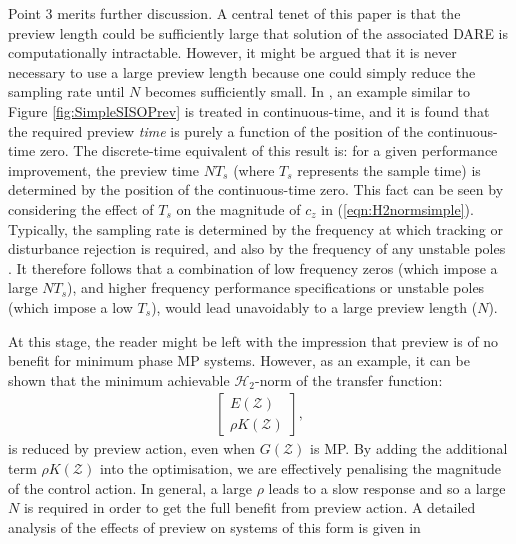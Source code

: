 \documentclass[a4paper,12pt]{article}
\theoremstyle{remark}
\newcommand{\ma}[1]{\begin{bmatrix} #1 \end{bmatrix}}
\newcommand{\als}[1]{\begin{align*} #1 \end{align*}}
\newcommand{\htwo}{\mathcal H_2}
\newcommand{\z}{\cal{Z}}
\renewcommand{\z}{\mathcal{Z}}
\begin{document}
Point 3 merits further discussion. A central tenet of this paper is that the preview length could be sufficiently large that solution of the associated {DARE} is computationally intractable. However, it might be argued that it is never necessary to use a large preview length because one could simply reduce the sampling rate until $N$ becomes sufficiently small.  In \cite{Middleteon_2004_PrevPerf}, an example similar to Figure \ref{fig:SimpleSISOPrev} is treated in continuous-time, and it is found that the required preview \textit{time} is purely a function of the position of the continuous-time zero. The discrete-time equivalent of this result is: for a given performance improvement, the preview time $NT_s$ (where $T_s$ represents the sample time) is determined by the position of the continuous-time zero. This fact can be seen by considering the effect of $T_s$ on the magnitude of $c_z$ in (\ref{eqn:H2normsimple}). Typically, the sampling rate is determined by the frequency at which tracking or disturbance rejection is required, and also by the frequency of any unstable poles \citep{Houpis_1991_DigitalControlSystems}. It therefore follows that a combination of low frequency zeros (which impose a large $NT_s$), and higher frequency performance specifications or unstable poles (which impose a low $T_s$), would lead unavoidably to a large preview length ($N$).%


At this stage, the reader might be left with the impression that preview is of no benefit for minimum phase {MP} systems. However, as an example, it can be shown that the minimum achievable $\htwo$-norm of the transfer function:
\als{
\ma{E(\z)\\\rho K(\z)}
,}
is reduced by preview action, even when $G(\z)$ is {MP}. By adding the additional term $\rho K(\z)$ into the optimisation,
we are effectively penalising the magnitude of the control action. In general, a large $\rho$ leads to a slow response and so a large $N$ is required in order to get the full benefit from preview action. A detailed analysis of the effects of preview on systems of this form is given in \cite[Chapter 4]{Hazell_2007_Thesis}
\end{document}
